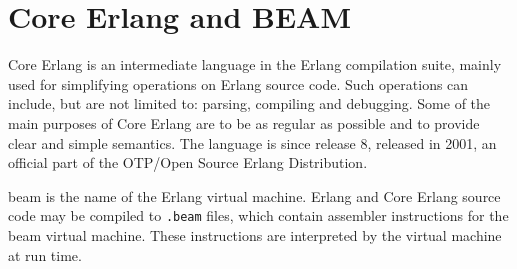 \section{Core Erlang and BEAM}

Core Erlang \cite{CoreErlangIntro} is an intermediate language in the Erlang compilation suite, mainly used for simplifying operations on Erlang source code. Such operations can include, but are not limited to: parsing, compiling and debugging. Some of the main purposes of Core Erlang are to be as regular as possible and to provide clear and simple semantics. The language is since release 8, released in 2001, an official part of the OTP/Open Source Erlang Distribution.

\Gls{beam} is the name of the Erlang virtual machine. Erlang and Core Erlang source code may be compiled to \texttt{.beam} files, which contain assembler instructions for the \gls{beam} virtual machine. These instructions are interpreted by the virtual machine at run time.
